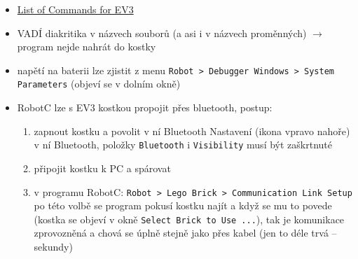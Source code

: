 \documentclass[12pt]{article}
\begin{document}
\begin{itemize}
	\item \href{http://help.robotc.net/WebHelpMindstorms/index.htm}{List of Commands for EV3}
	\item VADÍ diakritika v názvech souborů (a asi i v názvech proměnných) $\rightarrow$ program nejde nahrát do kostky
	\item  napětí na baterii lze zjistit z menu \texttt{Robot > Debugger Windows > System Parameters} (objeví se v dolním okně)
	\item RobotC lze s EV3 kostkou propojit přes bluetooth, postup: 
	\begin{enumerate}
		\item zapnout kostku a povolit v ní Bluetooth Nastavení (ikona vpravo nahoře) v ní Bluetooth, položky \texttt{Bluetooth} i \texttt{Visibility} musí být zaškrtnuté 
		\item připojit kostku k PC a spárovat 
		\item  v programu RobotC: \texttt{Robot > Lego Brick > Communication Link Setup} po této volbě se program pokusí kostku najít a když se mu to povede (kostka se objeví v okně \texttt{Select Brick to Use ...}),
		 tak je komunikace zprovozněná a chová se úplně stejně jako přes kabel (jen to déle trvá -- sekundy)   
	\end{enumerate}
	
\end{itemize}


 
 
\end{document}
